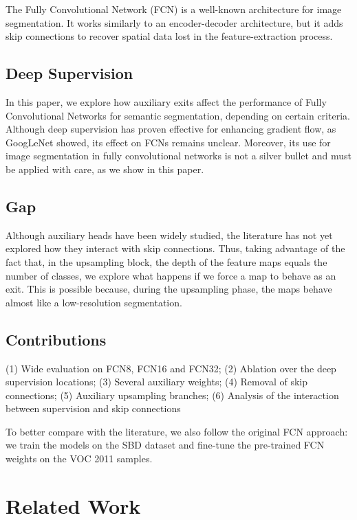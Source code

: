 \documentclass{article}
\begin{document}
    The Fully Convolutional Network (FCN) \cite{ref_fcn} is a well-known architecture for image segmentation. It works similarly to an encoder-decoder architecture, but it adds skip connections to recover spatial data lost in the feature-extraction process.

    \subsection{Deep Supervision}

    In this paper, we explore how auxiliary exits affect the performance of Fully Convolutional Networks for semantic segmentation, depending on certain criteria. Although deep supervision has proven effective for enhancing gradient flow, as GoogLeNet \cite{ref_googlenet} showed, its effect on FCNs remains unclear. Moreover, its use for image segmentation in fully convolutional networks is not a silver bullet and must be applied with care, as we show in this paper.

    \subsection{Gap}

    Although auxiliary heads have been widely studied, the literature has not yet explored how they interact with skip connections. Thus, taking advantage of the fact that, in the upsampling block, the depth of the feature maps equals the number of classes, we explore what happens if we force a map to behave as an exit. This is possible because, during the upsampling phase, the maps behave almost like a low-resolution segmentation.

    \subsection{Contributions}

    (1) Wide evaluation on FCN8, FCN16 and FCN32; (2) Ablation over the deep supervision locations; (3) Several auxiliary weights; (4) Removal of skip connections; (5) Auxiliary upsampling branches; (6) Analysis of the interaction between supervision and skip connections

    To better compare with the literature, we also follow the original FCN approach: we train the models on the SBD dataset and fine-tune the pre-trained FCN weights on the VOC 2011 samples.


\section{Related Work}
\end{document}

